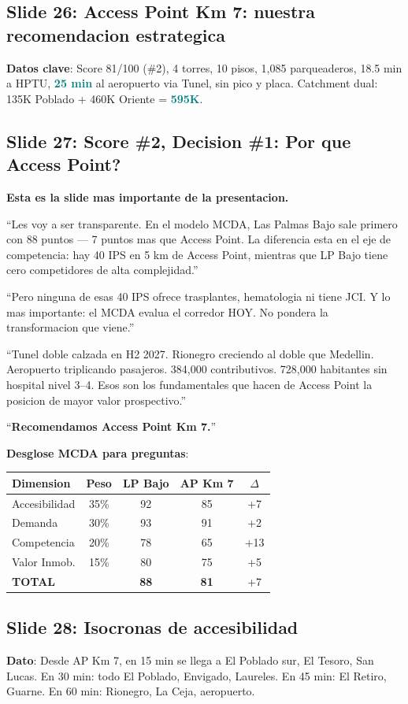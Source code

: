 \documentclass[10pt, a4paper]{article}
\newcommand{\hl}[1]{\textcolor{teal}{\textbf{#1}}}
\newcommand{\slide}[2]{\subsection{Slide #1: #2}}
\begin{document}
\slide{26}{Access Point Km 7: nuestra recomendacion estrategica}
\textbf{Datos clave}: Score 81/100 (\#2), 4 torres, 10 pisos, 1,085 parqueaderos, 18.5 min a HPTU, \hl{25 min} al aeropuerto via Tunel, sin pico y placa. Catchment dual: 135K Poblado + 460K Oriente = \hl{595K}.

\slide{27}{Score \#2, Decision \#1: Por que Access Point?}

\begin{tip}
\textbf{Esta es la slide mas importante de la presentacion.}

\vspace{4pt}
``Les voy a ser transparente. En el modelo MCDA, Las Palmas Bajo sale primero con 88 puntos --- 7 puntos mas que Access Point. La diferencia esta en el eje de competencia: hay 40 IPS en 5 km de Access Point, mientras que LP Bajo tiene cero competidores de alta complejidad.''

\vspace{4pt}
``Pero ninguna de esas 40 IPS ofrece trasplantes, hematologia ni tiene JCI. Y lo mas importante: el MCDA evalua el corredor HOY. No pondera la transformacion que viene.''

\vspace{4pt}
``Tunel doble calzada en H2 2027. Rionegro creciendo al doble que Medellin. Aeropuerto triplicando pasajeros. 384,000 contributivos. 728,000 habitantes sin hospital nivel 3--4. Esos son los fundamentales que hacen de Access Point la posicion de mayor valor prospectivo.''

\vspace{4pt}
``\textbf{Recomendamos Access Point Km 7.}''
\end{tip}

\textbf{Desglose MCDA para preguntas}:

{\small
\begin{tabular}{@{}lcccc@{}}
\toprule
\textbf{Dimension} & \textbf{Peso} & \textbf{LP Bajo} & \textbf{AP Km 7} & \textbf{$\Delta$} \\
\midrule
Accesibilidad & 35\% & 92 & 85 & +7 \\
Demanda & 30\% & 93 & 91 & +2 \\
Competencia & 20\% & 78 & 65 & +13 \\
Valor Inmob. & 15\% & 80 & 75 & +5 \\
\midrule
\textbf{TOTAL} & & \textbf{88} & \textbf{81} & +7 \\
\bottomrule
\end{tabular}
}

\slide{28}{Isocronas de accesibilidad}
\textbf{Dato}: Desde AP Km 7, en 15 min se llega a El Poblado sur, El Tesoro, San Lucas. En 30 min: todo El Poblado, Envigado, Laureles. En 45 min: El Retiro, Guarne. En 60 min: Rionegro, La Ceja, aeropuerto.
\end{document}
